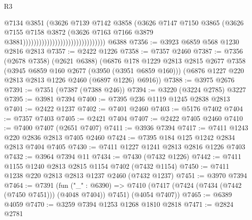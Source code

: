 \begin{lexlean}{R3}
\begin{coremodule}
                                                          @7134
                                                          @3851
                                                          (@3626
                                                            @7139
                                                            @7142
                                                            @3858
                                                            (@3626
                                                              @7147
                                                              @7150
                                                              @3865
                                                              (@3626
                                                                @7155
                                                                @7158
                                                                @3872
                                                                (@3626
                                                                  @7163
                                                                  @7166
                                                                  @3879
                                                                  @3881)))))))))))))))))))))))))))))))
    @6388
@7356 := @3923 @6859 @568 @1230 @2816 @2813
@7357 := @2422 @1226
@7358 := @7357 @2460
@7387 := @7356
    (@2678 @7358)
    (@2621 @6388)
    (@6876
      @178
      @1229
      @2813
      @2815
      @2677
      @7358
      (@3945 @6859 @160 @2677 (@3950 (@3951 @6859 @160)))
      (@6876 @1227 @220 @2813 @2813 @1226 @2460 (@6897 @1226) @6916))
@7388 := @3975 @2676
@7391 := @7351 (@7387 (@7388 @246))
@7394 := @3220 (@3224 @2785) @3227
@7395 := @3981 @7394
@7400 := @7395 @236 @1119 @1245 @2838 @2813
@7401 := @2422 @1237
@7402 := @7401 @2460
@7403 := @5176 @7402
@7404 := @7357 @7403
@7405 := @2421 @7404
@7407 := @2422 @7405 @2460
@7410 := @7400 @7407 (@2651 @7407)
@7411 := @3936 @7394
@7417 := @7411 @1243 @220 @2836 @2813 @7405 @2460
@7424 := @7395 @184 @125 @1242 @2834 @2813 @7404 @7405
@7430 := @7411 @1227 @1241 @2813 @2816 @1226 @7403
@7432 := @3964 @7394 @11
@7434 := @7430 (@7432 @1226)
@7442 := @7411 @1155 @1240 @2813 @2815 @1154 @7402 (@7432 @1154)
@7450 := @7411 @1238 @220 @2813 @2813 @1237 @2460 (@7432 @1237)
@7451 := @3970 @7394
@7464 := @7391
    (fun ("_" : @6390) =>
    @7410 (@7417 (@7424 (@7434 (@7442 (@7450 @7451))) (@4048 @7404)) @7451) (@4054 @7407))
@7465 := @6389 @4059
@7470 := @3259 @7394 @1253 @1268 @1810 @2818
@7471 := @2824 @2781

\end{coremodule}
\end{lexlean}
